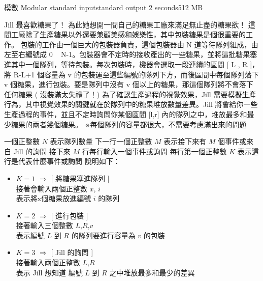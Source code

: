 \gdef\thisproblemauthor{}
\gdef\thisproblemdeveloper{}
\gdef\thisproblemorigin{}
\begin{problem}{模數 Modular}
{standard input}{standard output}
{2 seconds}{512 MB}{}

Jill 最喜歡糖果了！\newline
為此她想開一間自己的糖果工廠來滿足無止盡的糖果欲！\newline
\newline
這間工廠除了生產糖果以外還要兼顧美感和娛樂性，其中包裝糖果是個很重要的工作。\newline
包裝的工作由一個巨大的包裝器負責，這個包裝器由 N 道等待隊列組成，由左至右編號成 0 ~ N-1。包裝器會不定時的接收產出的一些糖果，並將這批糖果塞進其中一個隊列，等待包裝。每次包裝時，機器會選取一段連續的區間 [ L , R ]，將 R-L+1 個容量為 v 的包裝運至這些編號的隊列下方，而後區間中每個隊列落下 v 個糖果，進行包裝。要是隊列中沒有 v 個以上的糖果，那這個隊列將不會落下任何糖果 ( 沒裝滿太失禮了！)\newline
\newline
為了確認生產過程的視覺效果，Jill 需要模擬生產行為，其中視覺效果的關鍵就在於隊列中的糖果堆放數量差異。Jill 將會給你一些生產過程的事件，並且不定時詢問你某個區間 [l,r] 內的隊列之中，堆放最多和最少糖果的兩者幾個糖果。\newline
\newline
※每個隊列的容量都很大，不需要考慮滿出來的問題\newline


\InputFile

一個正整數 $N$ 表示隊列數量 \newline
下一行一個正整數 $M$ 表示接下來有 $M$ 個事件或來自 Jill 的詢問 \newline
接下來 $M$ 行每行輸入一個事件或詢問 \newline
每行第一個正整數 $K$ 表示這行是代表什麼事件或詢問 \newline \newline
說明如下：
\begin{itemize}
\item $K=1$ $\Rightarrow$ [ 將糖果塞進隊列 ] \\
            接著會輸入兩個正整數 $x$, $i$ \\
            表示將x個糖果放進編號 $i$ 的隊列
\item $K=2$ $\Rightarrow$ [ 進行包裝 ] \\
            接著輸入三個整數 $L$,$R$,$v$ \\
            表示編號 $L$ 到 $R$ 的隊列要進行容量為 $v$ 的包裝
\item $K=3$ $\Rightarrow$ [ Jill 的詢問 ] \\
            接著輸入兩個正整數 $L$,$R$ \\
            表示 Jill 想知道 編號 $L$ 到 $R$ 之中堆放最多和最少的差異
\end{itemize}


\end{problem}
